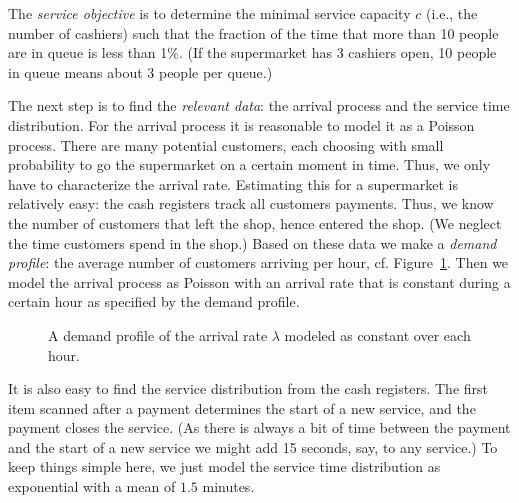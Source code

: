 The \emph{service objective} is to determine the minimal service
capacity $c$ (i.e., the number of cashiers) such that the fraction of the time that more than 
10 people are in queue is less than 1\%. (If the supermarket has 3 cashiers open, 10 people in queue  means about 3 people per queue.)

The next step is to find the \emph{relevant data}: the arrival process and the service time distribution. For the arrival process it is reasonable to model it as a Poisson process. There are many potential customers, each choosing with small probability to go the supermarket on a certain moment in time. Thus, we only have to  characterize the arrival rate. Estimating this for a supermarket  is relatively easy: the cash registers track all customers
payments. Thus, we know the number of customers that left the shop,
hence entered the shop. (We neglect the time customers spend in the
shop.) Based on these data we make a \emph{demand profile}: the
average number of customers arriving per hour, cf. Figure~\ref{fig:loadprofile}. Then we model the arrival process as Poisson with an arrival rate that is constant during a certain hour as specified by the demand profile. 

\begin{figure}[t]
  \centering
{}
  \caption{A  demand profile of the arrival rate $\lambda$ modeled as constant over each hour.}
  \label{fig:loadprofile}
\end{figure}


It is also easy to find the service distribution from the cash
registers. The first item scanned after a payment determines the start
of a new service, and the payment closes the service. (As there is
always a bit of time between the payment and the start of a new
service we might add 15 seconds, say, to any service.)
To keep things simple here, we just model the service time distribution as
exponential with a mean of $1.5$ minutes. 

